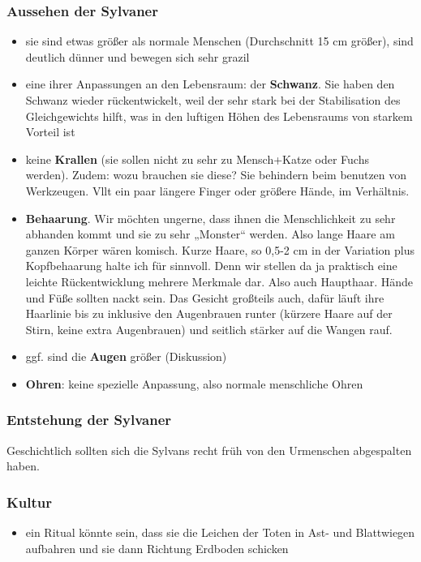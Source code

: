 \subsubsection{Aussehen der Sylvaner}
\begin{itemize}
	\item sie sind etwas größer als normale Menschen (Durchschnitt 15 cm größer), sind deutlich dünner und bewegen sich sehr grazil
	\item eine ihrer Anpassungen an den Lebensraum: der \textbf{Schwanz}. Sie haben den Schwanz wieder rückentwickelt, weil der sehr stark bei der Stabilisation des Gleichgewichts hilft, was in den luftigen Höhen des Lebensraums von starkem Vorteil ist
	\item keine \textbf{Krallen} (sie sollen nicht zu sehr zu Mensch+Katze oder Fuchs werden). Zudem: wozu brauchen sie diese? Sie behindern beim benutzen von Werkzeugen. Vllt ein paar längere Finger oder größere Hände, im Verhältnis. 
	\item \textbf{Behaarung}. Wir möchten ungerne, dass ihnen die Menschlichkeit zu sehr abhanden kommt und sie zu sehr „Monster“ werden. Also lange Haare am ganzen Körper wären komisch. Kurze Haare, so 0,5-2 cm in der Variation plus Kopfbehaarung halte ich für sinnvoll. Denn wir stellen da ja praktisch eine leichte Rückentwicklung mehrere Merkmale dar. Also auch Haupthaar. Hände und Füße sollten nackt sein. Das Gesicht großteils auch, dafür läuft ihre Haarlinie bis zu inklusive den Augenbrauen runter (kürzere Haare auf der Stirn, keine extra Augenbrauen) und seitlich stärker auf die Wangen rauf.
	\item ggf. sind die \textbf{Augen} größer (Diskussion)
	\item \textbf{Ohren}: keine spezielle Anpassung, also normale menschliche Ohren
\end{itemize}

\subsubsection{Entstehung der Sylvaner}
Geschichtlich sollten sich die Sylvans recht früh von den Urmenschen abgespalten haben.

\subsubsection{Kultur}
\begin{itemize}
	\item ein Ritual könnte sein, dass sie die Leichen der Toten in Ast- und Blattwiegen aufbahren und sie dann  Richtung Erdboden schicken
\end{itemize}


